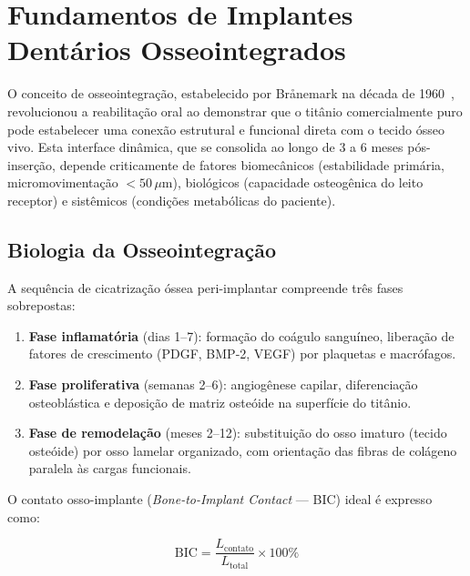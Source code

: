 
\section{Fundamentos de Implantes Dentários Osseointegrados}
\label{sec:fundamentos-implantes}

O conceito de osseointegração, estabelecido por Brånemark na década de 1960~\cite{branemark1983}, revolucionou a reabilitação oral ao demonstrar que o titânio comercialmente puro pode estabelecer uma conexão estrutural e funcional direta com o tecido ósseo vivo. Esta interface dinâmica, que se consolida ao longo de $3$ a $6$ meses pós-inserção, depende criticamente de fatores biomecânicos (estabilidade primária, micromovimentação $< 50\,\mu$m), biológicos (capacidade osteogênica do leito receptor) e sistêmicos (condições metabólicas do paciente).

\subsection{Biologia da Osseointegração}
\label{subsec:biologia-osseo}

A sequência de cicatrização óssea peri-implantar compreende três fases sobrepostas:

\begin{enumerate}
  \item \textbf{Fase inflamatória} (dias 1--7): formação do coágulo sanguíneo, liberação de fatores de crescimento (PDGF, BMP-2, VEGF) por plaquetas e macrófagos.
  \item \textbf{Fase proliferativa} (semanas 2--6): angiogênese capilar, diferenciação osteoblástica e deposição de matriz osteóide na superfície do titânio.
  \item \textbf{Fase de remodelação} (meses 2--12): substituição do osso imaturo (tecido osteóide) por osso lamelar organizado, com orientação das fibras de colágeno paralela às cargas funcionais.
\end{enumerate}

O contato osso-implante (\textit{Bone-to-Implant Contact} — BIC) ideal é expresso como:

\begin{equation}
\label{eq:bic}
\text{BIC} = \frac{L_{\text{contato}}}{L_{\text{total}}} \times 100\%
\end{equation}

